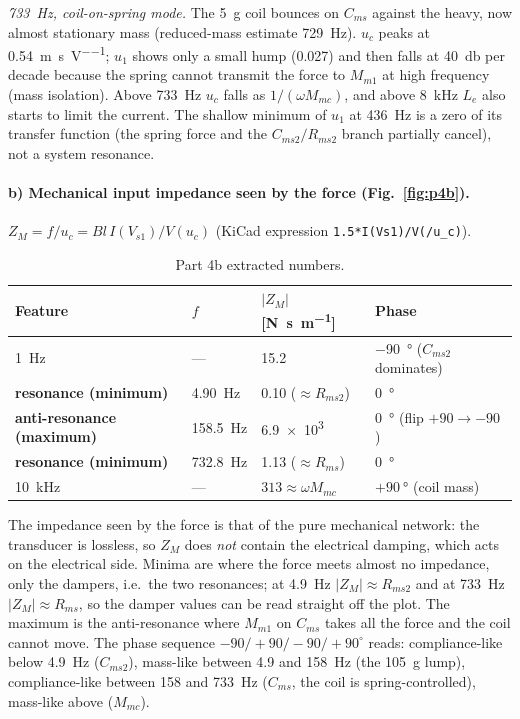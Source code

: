 \documentclass[a4paper,11pt]{article}
\begin{document}
\emph{\SI{733}{\hertz}, coil-on-spring mode.} The \SI{5}{\gram} coil bounces on $C_{ms}$ against the heavy, now almost
stationary mass (reduced-mass estimate \SI{729}{\hertz}). $u_c$ peaks at \SI{0.54}{\metre\per\second\per\volt};
$u_1$ shows only a small hump (0.027) and then falls at \SI{40}{\decibel} per decade because the spring cannot transmit
the force to $M_{m1}$ at high frequency (mass isolation). Above \SI{733}{\hertz} $u_c$ falls as $1/(\omega M_{mc})$,
and above \SI{8}{\kilo\hertz} $L_e$ also starts to limit the current. The shallow minimum of $u_1$ at \SI{436}{\hertz} is
a zero of its transfer function (the spring force and the $C_{ms2}/R_{ms2}$ branch partially cancel), not a system
resonance.

\FloatBarrier
\paragraph{b) Mechanical input impedance seen by the force (Fig.~\ref{fig:p4b}).} $Z_M = f/u_c = Bl\,I(V_{s1})/V(u_c)$
(KiCad expression \texttt{1.5*I(Vs1)/V(/u\_c)}).
\begin{table}[H]\centering\small
\begin{tabular}{@{}llll@{}}\toprule
Feature & $f$ & $|Z_M|$ [\si{\newton\second\per\metre}] & Phase \\ \midrule
\SI{1}{\hertz} & --- & 15.2 & \SI{-90}{\degree} ($C_{ms2}$ dominates) \\
\textbf{resonance (minimum)} & \SI{4.90}{\hertz} & 0.10 ($\approx R_{ms2}$) & \SI{0}{\degree} \\
\textbf{anti-resonance (maximum)} & \SI{158.5}{\hertz} & \num{6.9e3} & \SI{0}{\degree} (flip $+90\to-90$) \\
\textbf{resonance (minimum)} & \SI{732.8}{\hertz} & 1.13 ($\approx R_{ms}$) & \SI{0}{\degree} \\
\SI{10}{\kilo\hertz} & --- & $313\approx\omega M_{mc}$ & $+\SI{90}{\degree}$ (coil mass) \\
\bottomrule\end{tabular}
\caption{Part 4b extracted numbers.}
\end{table}
The impedance seen by the force is that of the pure mechanical network: the transducer is lossless, so $Z_M$ does
\emph{not} contain the electrical damping, which acts on the electrical side. Minima are where the force meets almost
no impedance, only the dampers, i.e.\ the two resonances; at \SI{4.9}{\hertz} $|Z_M|\approx R_{ms2}$ and at
\SI{733}{\hertz} $|Z_M|\approx R_{ms}$, so the damper values can be read straight off the plot. The maximum is the
anti-resonance where $M_{m1}$ on $C_{ms}$ takes all the force and the coil cannot move. The phase sequence
$-90/+90/-90/+90^\circ$ reads: compliance-like below \SI{4.9}{\hertz} ($C_{ms2}$), mass-like between 4.9 and
\SI{158}{\hertz} (the \SI{105}{\gram} lump), compliance-like between 158 and \SI{733}{\hertz} ($C_{ms}$, the coil is
spring-controlled), mass-like above ($M_{mc}$).
\end{document}
